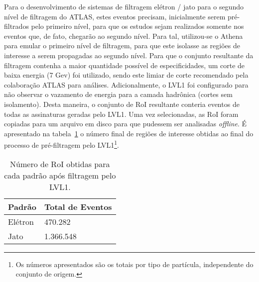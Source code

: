 Para o desenvolvimento de sistemas de filtragem elétron / jato para o segundo nível de filtragem do ATLAS, estes eventos precisam, inicialmente serem pré-filtrados pelo primeiro nível, para que os estudos sejam realizados somente nos eventos que, de fato, chegarão ao segundo nível. Para tal, utilizou-se o Athena para emular o primeiro nível de filtragem, para que este isolasse as regiões de interesse a serem propagadas ao segundo nível. Para que o conjunto resultante da filtragem contenha a maior quantidade possível de especificidades, um corte de baixa energia (7 Gev) foi utilizado, sendo este limiar de corte recomendado pela colaboração ATLAS para análises. Adicionalmente, o LVL1 foi configurado para não observar o vazamento de energia para a camada hadrônica (cortes sem isolamento). Desta maneira, o conjunto de RoI resultante conteria eventos de todas as assinaturas geradas pelo LVL1. Uma vez selecionadas,  as RoI foram copiadas para um arquivo em disco para que pudessem ser analisadas \emph{offline}. É apresentado na tabela~\ref{tab:num_eventos_filtrados}  o número final de regiões de interesse obtidas ao final do processo de pré-filtragem pelo LVL1\footnote{Os números apresentados são os totais por tipo de partícula, independente do conjunto de origem.}.

\begin{table}
\caption{Número de RoI obtidas para cada padrão após filtragem pelo LVL1.}
\begin{center}
\begin{tabular}{|l|l|}
\hline
\textbf{Padrão} & \textbf{Total de Eventos} \\
\hline
Elétron & 470.282 \\
\hline
Jato &  1.366.548 \\
\hline
\end{tabular}
\end{center}
\label{tab:num_eventos_filtrados}
\end{table} 

